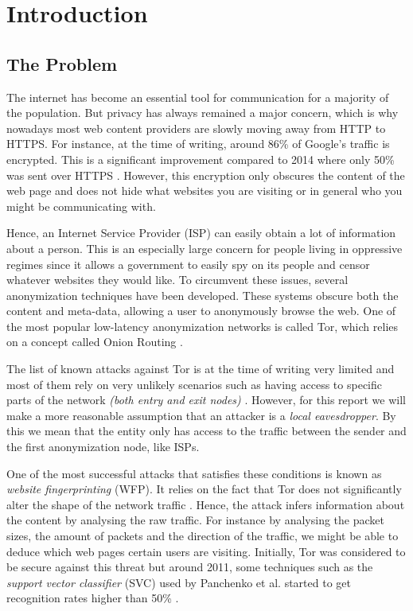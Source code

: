 \section{Introduction}

\subsection{The Problem}

The internet has become an essential tool for communication for a majority of the population. But privacy has always remained a major concern,
which is why nowadays most web content providers are slowly moving away from HTTP to HTTPS.
For instance, at the time of writing, around 86\% of Google’s traffic is encrypted. This is a significant improvement compared to 2014 where only 50\%
was sent over HTTPS \cite{google_transparancy}. However, this encryption only obscures the content of the web page and does not
hide what websites you are visiting or in general who you might be communicating with.

Hence, an Internet Service Provider (ISP) can easily obtain a lot of information about a person.
This is an especially large concern for people living in oppressive regimes since it allows a government to easily spy on its people and
censor whatever websites they would like. To circumvent these issues, several anonymization techniques have been developed.
These systems obscure both the content and meta-data, allowing a user to anonymously browse the web. One of the most popular low-latency anonymization
networks is called Tor, which relies on a concept called Onion Routing \cite{tor_project}.

The list of known attacks against Tor is at the time of writing very limited and most of them rely on very
unlikely scenarios such as having access to specific parts of the network \textit{(both entry and exit nodes)} \cite{tor_project}.
However, for this report we will make a more reasonable assumption that an attacker is a \textit{local eavesdropper}.
By this we mean that the entity only has access to the traffic between the sender and the first anonymization node, like ISPs.

One of the most successful attacks that satisfies these conditions is known as \textit{website fingerprinting} (WFP).
It relies on the fact that Tor does not significantly alter the shape of the network traffic \cite{kfingerprinting}.
Hence, the attack infers information about the content by analysing the raw traffic.
For instance by analysing the packet sizes, the amount of packets and the direction of the traffic, we might be able to deduce
which web pages certain users are visiting.
Initially, Tor was considered to be secure against this threat but around 2011, some techniques such as the \textit{support vector classifier} (SVC)
used by Panchenko et al. started to get recognition rates higher than 50\% \cite{panchenko1}.

